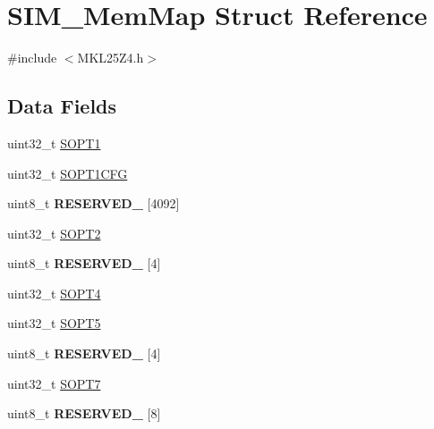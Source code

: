 \hypertarget{struct_s_i_m___mem_map}{}\section{S\+I\+M\+\_\+\+Mem\+Map Struct Reference}
\label{struct_s_i_m___mem_map}


{\ttfamily \#include $<$M\+K\+L25\+Z4.\+h$>$}

\subsection*{Data Fields}
\begin{DoxyCompactItemize}
\item 
uint32\+\_\+t \hyperlink{struct_s_i_m___mem_map_a4aba1e2e56918ee06126ced3810264d4}{S\+O\+P\+T1}
\item 
uint32\+\_\+t \hyperlink{struct_s_i_m___mem_map_a8fdfe78d66039ba5cfbf48cf8a267bee}{S\+O\+P\+T1\+C\+F\+G}
\item 
\hypertarget{struct_s_i_m___mem_map_ae7904b8fe3af1def40d58c2ca8123e44}{}uint8\+\_\+t {\bfseries R\+E\+S\+E\+R\+V\+E\+D\+\_} \mbox{[}4092\mbox{]}\label{struct_s_i_m___mem_map_ae7904b8fe3af1def40d58c2ca8123e44}

\item 
uint32\+\_\+t \hyperlink{struct_s_i_m___mem_map_aa99d50c9e64bf212c32cfde56465e569}{S\+O\+P\+T2}
\item 
\hypertarget{struct_s_i_m___mem_map_a422ac2beba1cc5c797380d1c5832b885}{}uint8\+\_\+t {\bfseries R\+E\+S\+E\+R\+V\+E\+D\+\_} \mbox{[}4\mbox{]}\label{struct_s_i_m___mem_map_a422ac2beba1cc5c797380d1c5832b885}

\item 
uint32\+\_\+t \hyperlink{struct_s_i_m___mem_map_a6f70ab94a412c93f57c2ca3ee84dbdd3}{S\+O\+P\+T4}
\item 
uint32\+\_\+t \hyperlink{struct_s_i_m___mem_map_adff606be08a472231b4f9f5afd603bd6}{S\+O\+P\+T5}
\item 
\hypertarget{struct_s_i_m___mem_map_acc19a07675d1806592b3ed4a92f91e1c}{}uint8\+\_\+t {\bfseries R\+E\+S\+E\+R\+V\+E\+D\+\_} \mbox{[}4\mbox{]}\label{struct_s_i_m___mem_map_acc19a07675d1806592b3ed4a92f91e1c}

\item 
uint32\+\_\+t \hyperlink{struct_s_i_m___mem_map_a613f7f9e67cc95762537d6cbf4800ae0}{S\+O\+P\+T7}
\item 
\hypertarget{struct_s_i_m___mem_map_a86684537b595133db57a7bcc73843d2a}{}uint8\+\_\+t {\bfseries R\+E\+S\+E\+R\+V\+E\+D\+\_} \mbox{[}8\mbox{]}\label{struct_s_i_m___mem_map_a86684537b595133db57a7bcc73843d2a}


\end{DoxyCompactItemize}
